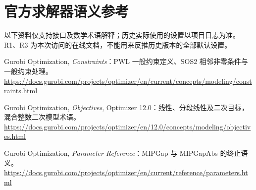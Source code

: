 \documentclass[UTF8,11pt,a4paper,fontset=fandol]{ctexart}
\begin{document}
\section{官方求解器语义参考}
以下资料仅支持接口及数学术语解释；历史实际使用的设置以项目日志为准。R1、R3 为本次访问的在线文档，不能用来反推历史版本的全部默认设置。
\begin{enumerate}[label={[R\arabic*]}]
\item Gurobi Optimization, \emph{Constraints}：PWL 一般约束定义、SOS2 相邻非零条件与一般约束处理。\\
\url{https://docs.gurobi.com/projects/optimizer/en/current/concepts/modeling/constraints.html}
\item Gurobi Optimization, \emph{Objectives}, Optimizer 12.0：线性、分段线性及二次目标，混合整数二次模型术语。\\
\url{https://docs.gurobi.com/projects/optimizer/en/12.0/concepts/modeling/objectives.html}
\item Gurobi Optimization, \emph{Parameter Reference}：MIPGap 与 MIPGapAbs 的终止语义。\\
\url{https://docs.gurobi.com/projects/optimizer/en/current/reference/parameters.html}
\end{enumerate}
\end{document}

